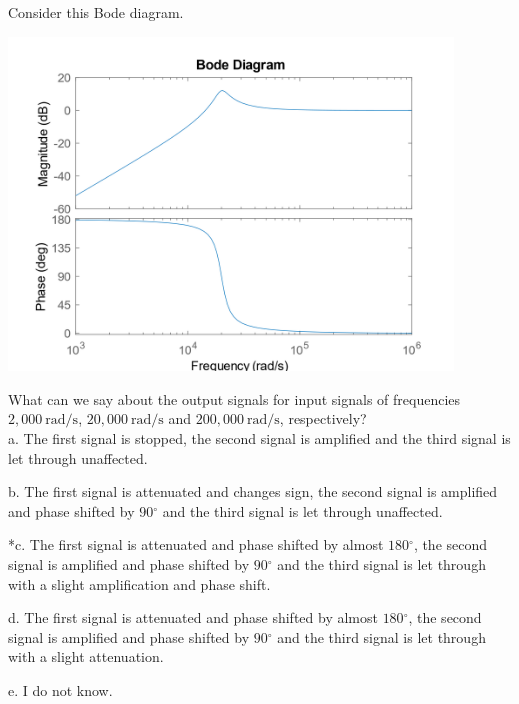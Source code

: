 
Consider this Bode diagram.

\includegraphics[width=4.64719in,height=3.48617in]{../../Images/BodeDiagramQ1.png}

What can we say about the output signals for input signals of frequencies \(2,000\ \text{rad/s}\), \(20,000\ \text{rad/s}\) and \(200,000\ \text{rad/s}\), respectively?\\

a. The first signal is stopped, the second signal is amplified and the third signal is let through unaffected.

b. The first signal is attenuated and changes sign, the second signal is amplified and phase shifted by \(90{^\circ}\) and the third signal is let through unaffected.

*c. The first signal is attenuated and phase shifted by almost \(180{^\circ}\), the second signal is amplified and phase shifted by \(90{^\circ}\) and the third signal is let through with a slight amplification and phase shift.

d. The first signal is attenuated and phase shifted by almost \(180{^\circ}\), the second signal is amplified and phase shifted by \(90{^\circ}\) and the third signal is let through with a slight attenuation.

e. I do not know.\\
